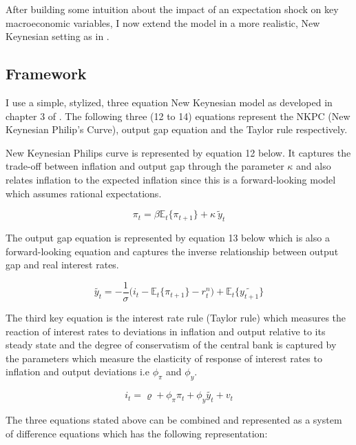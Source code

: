 \documentclass[12pt]{article}
\newcommand{\1}{\mathbbm 1}
\renewcommand{\rho}{\varrho}
\begin{document}
		
		After building some intuition about the impact of an expectation shock on key macroeconomic variables, I now extend the model in a more realistic, New Keynesian setting as in \cite{gali2015book}.
		
		\subsection{Framework}
		
		I use a simple, stylized, three equation New Keynesian model as developed in chapter 3 of \cite{gali2015book}. The following three (12 to 14) equations represent the NKPC (New Keynesian Philip's Curve), output gap equation and the Taylor rule respectively.
		
	New Keynesian Philips curve is represented by equation 12 below. It captures the trade-off between inflation and output gap through the parameter $\kappa$ and also relates inflation to the expected inflation since this is a forward-looking model which assumes rational expectations.
	
	 
	
	\begin{equation}
		\pi_{t} = \beta \mathbb{E}_{t}\{\pi_{t+1}\} + \kappa \: \widetilde{y}_{t}
	\end{equation}

The output gap equation is represented by equation 13 below which is also a forward-looking equation and captures the inverse relationship between output gap and real interest rates.

	\begin{equation}
	\widetilde{y_{t}} = -\frac{1}{\sigma} \big(i_{t} - \mathbb{E}_{t}\{\pi_{t+1}\} - r_{t}^{n}\big) + \mathbb{E}_{t}\{\widetilde{y_{t+1}}\}
\end{equation}

The third key equation is the interest rate rule (Taylor rule) which measures the reaction of interest rates to deviations in inflation and output relative to its steady state and the degree of conservatism of the central bank is captured by the parameters which measure the elasticity of response of interest rates to inflation and output deviations i.e $\phi_{\pi}$ and $\phi_{y}$.

\begin{equation}
	i_{t} = \rho + \phi_{\pi} \pi_{t} + \phi_{y} \widetilde{y_{t}} + v_{t} 
\end{equation}


The three equations stated above can be combined and represented as a system of difference equations which has the following representation:
\end{document}
